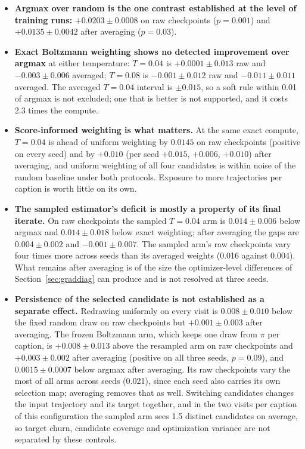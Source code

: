 \documentclass[11pt,a4paper]{article}
\begin{document}
\begin{itemize}
\item \textbf{Argmax over random is the one contrast established at the level of training runs:} $+0.0203\pm0.0008$ on raw checkpoints ($p=0.001$) and $+0.0135\pm0.0042$ after averaging ($p=0.03$).
\item \textbf{Exact Boltzmann weighting shows no detected improvement over argmax} at either temperature: $T=0.04$ is $+0.0001\pm0.013$ raw and $-0.003\pm0.006$ averaged; $T=0.08$ is $-0.001\pm0.012$ raw and $-0.011\pm0.011$ averaged. The averaged $T=0.04$ interval is $\pm0.015$, so a soft rule within 0.01 of argmax is not excluded; one that is better is not supported, and it costs 2.3 times the compute.
\item \textbf{Score-informed weighting is what matters.} At the same exact compute, $T=0.04$ is ahead of uniform weighting by $0.0145$ on raw checkpoints (positive on every seed) and by $+0.010$ (per seed $+0.015$, $+0.006$, $+0.010$) after averaging, and uniform weighting of all four candidates is within noise of the random baseline under both protocols. Exposure to more trajectories per caption is worth little on its own.
\item \textbf{The sampled estimator's deficit is mostly a property of its final iterate.} On raw checkpoints the sampled $T=0.04$ arm is $0.014\pm0.006$ below argmax and $0.014\pm0.018$ below exact weighting; after averaging the gaps are $0.004\pm0.002$ and $-0.001\pm0.007$. The sampled arm's raw checkpoints vary four times more across seeds than its averaged weights (0.016 against 0.004). What remains after averaging is of the size the optimizer-level differences of Section~\ref{sec:graddiag} can produce and is not resolved at three seeds.
\item \textbf{Persistence of the selected candidate is not established as a separate effect.} Redrawing uniformly on every visit is $0.008\pm0.010$ below the fixed random draw on raw checkpoints but $+0.001\pm0.003$ after averaging. The frozen Boltzmann arm, which keeps one draw from $\pi$ per caption, is $+0.008\pm0.013$ above the resampled arm on raw checkpoints and $+0.003\pm0.002$ after averaging (positive on all three seeds, $p=0.09$), and $0.0015\pm0.0007$ below argmax after averaging. Its raw checkpoints vary the most of all arms across seeds (0.021), since each seed also carries its own selection map; averaging removes that as well. Switching candidates changes the input trajectory and its target together, and in the two visits per caption of this configuration the sampled arm sees 1.5 distinct candidates on average, so target churn, candidate coverage and optimization variance are not separated by these controls.

\end{itemize}
\end{document}
